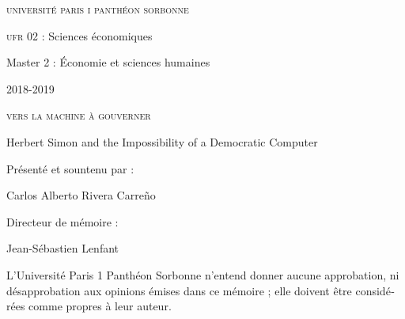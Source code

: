 \documentclass[version=last,draft=true,paper=A4,portrait,twoside=true,twocolumn=false,headinclude=false,footinclude=false,fontsize=11,BCOR=20mm,DIV=calc,pagesize=auto,titlepage=firstiscover,mpinclude=false,open=right,chapterprefix=true,numbers=autoendperiod,headsepline=false,parskip=false]{scrbook}
\author{Carlos Alberto Rivera Carreño}
\date{}
\title{}
\begin{document}


\begin{titlepage}
 \centering
\begin{french}
 {\large \textsc{université paris i panthéon sorbonne} \par}
 \vspace{0.5\baselineskip}
 {\large \textsc{ufr} 02 : Sciences économiques  \par}
 \vspace{0.5\baselineskip}
 {\large Master 2 : Économie et sciences humaines \par}
 \vspace{0.5\baselineskip}
 {\large 2018-2019 \par}
\end{french}
 \vspace{6\baselineskip}
 {\huge \textsc{vers la machine à gouverner}  \par}
 {\Large Herbert Simon and the Impossibility of a Democratic Computer \par}
\vfill
\begin{french}
 {\large Présenté et sountenu par : \par}
\end{french}
 {\Large Carlos Alberto Rivera Carreño \par}
 \vspace{1\baselineskip}
\begin{french}
 {\large Directeur de mémoire : \par}
\end{french}
 {\Large Jean-Sébastien Lenfant \par}
\end{titlepage}

\pagestyle{empty}

\begin{french}
L'Université Paris 1 Panthéon Sorbonne n'entend donner aucune approbation,
ni désapprobation aux opinions émises dans ce mémoire ; elle doivent être
considérées comme propres à leur auteur. 
\end{french}
\vfill
\end{document}
